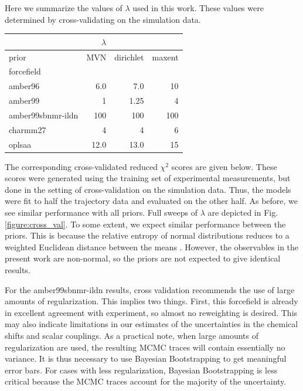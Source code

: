 \documentclass[12pt]{article}
\begin{document}
Here we summarize the values of $\lambda$ used in this work.  These values were determined by cross-validating on the simulation data.  

\vspace{5mm}

\begin{tabular}{lrrr}
\toprule
{}                &$\lambda$  &   &      \\
\midrule
prior &       MVN &  dirichlet & maxent \\
forcefield        &           &         \\
amber96           &      6.0  &    7.0  & 10 \\
amber99           &      1    &    1.25 & 4 \\
amber99sbnmr-ildn &      100  &    100  & 100 \\
charmm27          &      4    &   4     & 6 \\
oplsaa            &     12.0 &    13.0  & 15 \\
\bottomrule
\end{tabular}

\vspace{5mm}

The corresponding cross-validated reduced $\chi^2$ scores are given below.  These scores were generated using the training set of experimental measurements, but done in the setting of cross-validation on the simulation data.  Thus, the models were fit to half the trajectory data and evaluated on the other half.  As before, we see similar performance with all priors.  Full sweeps of $\lambda$ are depicted in Fig. \ref{figure:cross_val}.  To some extent, we expect similar performance between the priors.  This is because the relative entropy of normal distributions reduces to a weighted Euclidean distance between the means \cite{relative_entropy_wiki}.  However, the observables in the present work are non-normal, so the priors are not expected to give identical results.

For the amber99sbnmr-ildn results, cross validation recommends the use of large amounts of regularization.  This implies two things.  First, this forcefield is already in excellent agreement with experiment, so almost no reweighting is desired.  This may also indicate limitations in our estimates of the uncertainties in the chemical shifts and scalar couplings.  As a practical note, when large amounts of regularization are used, the resulting MCMC traces will contain essentially no variance.  It is thus necessary to use Bayesian Bootstrapping to get meaningful error bars.  For cases with less regularization, Bayesian Bootstrapping is less critical because the MCMC traces account for the majority of the uncertainty.
\end{document}
